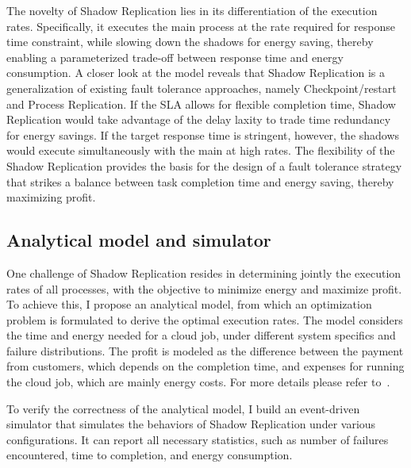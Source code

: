 The novelty of Shadow Replication lies in its differentiation of the execution rates. Specifically, it 
executes the main process at the rate required for response time constraint, while slowing down the shadows for energy saving, thereby enabling a parameterized trade-off between response time and energy consumption.
A closer look at the model reveals that Shadow
Replication is a generalization of existing fault tolerance
approaches, namely Checkpoint/restart and Process Replication. If the
SLA allows for flexible completion time, Shadow
Replication would take advantage of the delay laxity to trade time
redundancy for energy savings. %
If the target response time is
stringent, however, %
the shadows would execute simultaneously with the main at high
rates. The flexibility of the Shadow Replication provides the
basis for the design of a fault tolerance strategy that strikes a
balance between task completion time and energy saving, thereby
maximizing profit.

\subsection{Analytical model and simulator}

One challenge of Shadow Replication resides in determining
jointly the execution rates of all processes, %
with the objective to minimize energy and
maximize profit. To achieve this, I propose an analytical
model, from which an optimization problem is formulated to derive the optimal execution rates. The model considers the time and energy needed for a cloud job, %
under different system specifics and failure distributions. The profit is modeled as the difference between the payment from customers, which depends on the completion time, and expenses for running the cloud job, which are mainly energy costs. %
For more details please refer to~\cite{cui_en7085151}. 

To verify the correctness of the analytical model, I build an event-driven simulator that simulates the behaviors of Shadow Replication under various configurations. It can report all necessary statistics, such as number of failures encountered, time to completion, and energy consumption. 

